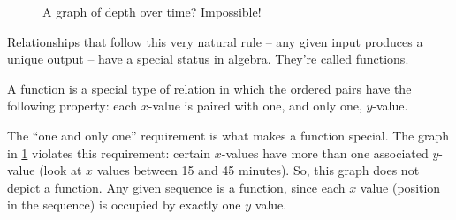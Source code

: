 \begin{figure}[!htbp]
\centering
{}
	\caption{A graph of depth over time? Impossible!}
	\label{fig:impossible}
\end{figure}

Relationships that follow this very natural rule -- any given input produces a unique output -- have a special status in algebra. They're called \glspl{function}.


\begin{boxeddef}[Function]
A \gls{function} is a special type of relation in which the ordered pairs have the following property: each $x$-value is paired with one, and only one, $y$-value.
\end{boxeddef}

The ``one and only one'' requirement is what makes a function special. The graph in \cref{fig:impossible} violates this requirement: certain $x$-values have more than one associated $y$-value (look at $x$ values between 15 and 45 minutes). So, this graph does not depict a function. Any given sequence is a function, since each $x$ value (position in the sequence) is occupied by exactly one $y$ value.

